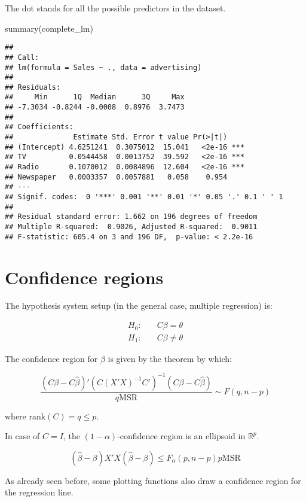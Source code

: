\documentclass[
  oneside]{book}
\newenvironment{Shaded}{\begin{snugshade}}{\end{snugshade}}
\newcommand{\FunctionTok}[1]{\textcolor[rgb]{0.00,0.00,0.00}{#1}}
\newcommand{\NormalTok}[1]{#1}
\begin{document}
The dot stands for all the possible predictors in the dataset.

\begin{Shaded}
\begin{Highlighting}[]
\FunctionTok{summary}\NormalTok{(complete\_lm)}
\end{Highlighting}
\end{Shaded}

\begin{verbatim}
## 
## Call:
## lm(formula = Sales ~ ., data = advertising)
## 
## Residuals:
##     Min      1Q  Median      3Q     Max 
## -7.3034 -0.8244 -0.0008  0.8976  3.7473 
## 
## Coefficients:
##              Estimate Std. Error t value Pr(>|t|)    
## (Intercept) 4.6251241  0.3075012  15.041   <2e-16 ***
## TV          0.0544458  0.0013752  39.592   <2e-16 ***
## Radio       0.1070012  0.0084896  12.604   <2e-16 ***
## Newspaper   0.0003357  0.0057881   0.058    0.954    
## ---
## Signif. codes:  0 '***' 0.001 '**' 0.01 '*' 0.05 '.' 0.1 ' ' 1
## 
## Residual standard error: 1.662 on 196 degrees of freedom
## Multiple R-squared:  0.9026, Adjusted R-squared:  0.9011 
## F-statistic: 605.4 on 3 and 196 DF,  p-value: < 2.2e-16
\end{verbatim}

\hypertarget{confidence-regions}{%
\section{Confidence regions}\label{confidence-regions}}

The hypothesis system setup (in the general case, multiple regression) is:

\[
\begin{aligned}
H_0: &\quad C \beta = \theta\\
H_1: &\quad C \beta \neq \theta
\end{aligned}
\]

The confidence region for \(\beta\) is given by the theorem by which:

\[
\frac{(C\beta - C\hat\beta)' (C(X'X)^{-1}C')^{-1}(C\beta - C\hat\beta)}
{q \text{MSR}} \sim F(q, n-p)
\]

where \(\text{rank}(C) = q \leq p\).

In case of \(C = I\), the \((1 - \alpha)\)-confidence region
is an ellipsoid in \(\mathbb{R}^p\).

\[
(\hat\beta - \beta) X' X (\hat\beta - \beta) \leq 
F_{\alpha}(p, n-p) p \text{MSR}
\]

As already seen before, some plotting functions also draw a confidence region
for the regression line.
\end{document}
